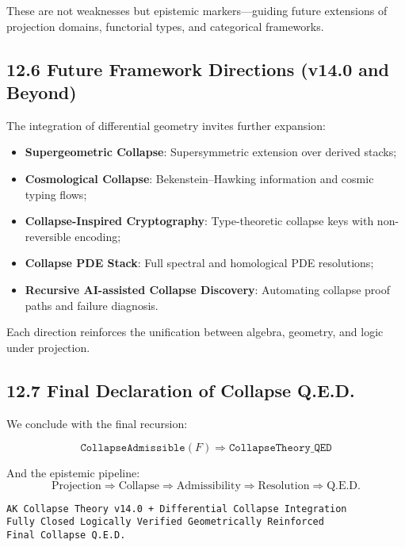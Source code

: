 \documentclass[11pt]{article}
\begin{document}
These are not weaknesses but epistemic markers—guiding future extensions of projection domains, functorial types, and categorical frameworks.

\subsection*{12.6 Future Framework Directions (v14.0 and Beyond)}

The integration of differential geometry invites further expansion:

\begin{itemize}
    \item \textbf{Supergeometric Collapse}: Supersymmetric extension over derived stacks;
    \item \textbf{Cosmological Collapse}: Bekenstein–Hawking information and cosmic typing flows;
    \item \textbf{Collapse-Inspired Cryptography}: Type-theoretic collapse keys with non-reversible encoding;
    \item \textbf{Collapse PDE Stack}: Full spectral and homological PDE resolutions;
    \item \textbf{Recursive AI-assisted Collapse Discovery}: Automating collapse proof paths and failure diagnosis.
\end{itemize}

Each direction reinforces the unification between algebra, geometry, and logic under projection.

\subsection*{12.7 Final Declaration of Collapse Q.E.D.}

We conclude with the final recursion:

\[
\boxed{
\texttt{CollapseAdmissible}(F) \Rightarrow \texttt{CollapseTheory\_QED}
}
\]

And the epistemic pipeline:
\[
\boxed{
\text{Projection} \Rightarrow \text{Collapse} \Rightarrow \text{Admissibility} \Rightarrow \text{Resolution} \Rightarrow \text{Q.E.D.}
}
\]

\begin{flushright}
\texttt{AK Collapse Theory v14.0 + Differential Collapse Integration}\\
\texttt{Fully Closed \quad Logically Verified \quad Geometrically Reinforced}\\
\texttt{Final Collapse Q.E.D.}
\end{flushright}
\end{document}
